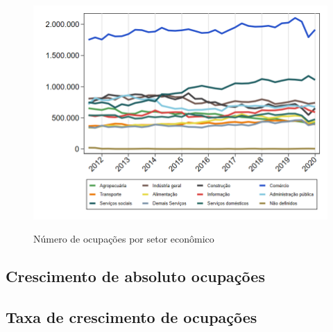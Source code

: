 \documentclass[10pt]{beamer}
\begin{document}
\begin{frame}
\textit{\hyperlink{indice_principal_amz_urbana}{}}
\begin{figure}
  \centering
  \includegraphics[width=.85\linewidth]{./../analysis/output/_amz_urbana_importancia_relativa.png}
  \label{_amz_urbana_importancia_relativa}
  \caption{{Número de ocupações por setor econômico}}
\end{figure}
\end{frame}

\subsection{Crescimento de absoluto ocupações}

\begin{frame}
\textit{\hyperlink{indice_principal_amz_urbana}{}}

\end{frame}

\begin{frame}
\textit{\hyperlink{indice_principal_amz_urbana}{}}

\end{frame}

\begin{frame}
\textit{\hyperlink{indice_principal_amz_urbana}{}}

\end{frame}

\subsection{Taxa de crescimento de ocupações}
\end{document}
